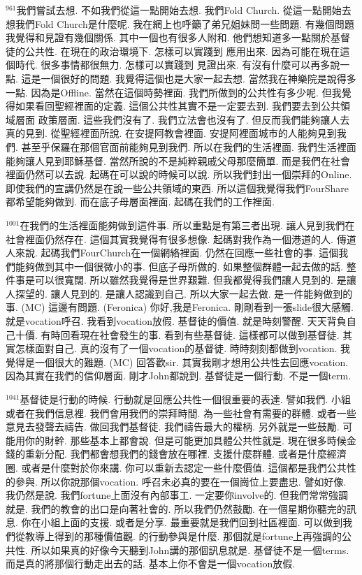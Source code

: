 \documentclass{book}
\begin{document}
$^{961}$我們嘗試去想.
不如我們從這一點開始去想.
我們Fold Church.
從這一點開始去想我們Fold Church是什麼呢.
我在網上也呼籲了弟兄姐妹問一些問題.
有幾個問題我覺得和見證有幾個關係.
其中一個也有很多人附和.
他們想知道多一點關於基督徒的公共性.
在現在的政治環境下.
怎樣可以實踐到 應用出來.
因為可能在現在這個時代.
很多事情都很無力.
怎樣可以實踐到 見證出來.
有沒有什麼可以再多說一點.
這是一個很好的問題.
我覺得這個也是大家一起去想.
當然我在神樂院是說得多一點.
因為是Offline.
當然在這個時勢裡面.
我們所做到的公共性有多少呢.
但我覺得如果看回聖經裡面的定義.
這個公共性其實不是一定要去到.
我們要去到公共領域層面 政策層面.
這些我們沒有了.
我們立法會也沒有了.
但反而我們能夠讓人去真的見到.
從聖經裡面所說.
在安提阿教會裡面.
安提阿裡面城市的人能夠見到我們.
甚至乎保羅在那個官面前能夠見到我們.
所以在我們的生活裡面.
我們生活裡面能夠讓人見到耶穌基督.
當然所說的不是純粹親戚父母那麼簡單.
而是我們在社會裡面仍然可以去說.
起碼在可以說的時候可以說.
所以我們封出一個崇拜的Online.
即使我們的宣講仍然是在說一些公共領域的東西.
所以這個我覺得我們FourShare都希望能夠做到.
而在底子母層面裡面.
起碼在我們的工作裡面.

$^{1001}$在我們的生活裡面能夠做到這件事.
所以重點是有第三者出現.
讓人見到我們在社會裡面仍然存在.
這個其實我覺得有很多想像.
起碼對我作為一個港道的人.
傳道人來說.
起碼我們FourChurch在一個網絡裡面.
仍然在回應一些社會的事.
這個我們能夠做到其中一個很微小的事.
但底子母所做的.
如果整個群體一起去做的話.
整件事是可以很寬闊.
所以雖然我覺得是世界艱難.
但我都覺得我們讓人見到的.
是讓人探望的.
讓人見到的.
是讓人認識到自己.
所以大家一起去做.
是一件能夠做到的事.
(MC) 這邊有問題.
(Feronica) 你好,我是Feronica.
剛剛看到一張slide很大感觸.
就是vocation呼召.
我看到vocation放假.
基督徒的價值.
就是時刻警醒.
天天背負自己十價.
有時回看現在社會發生的事.
看到有些基督徒.
這樣都可以做到基督徒.
其實怎樣面對自己.
真的沒有了一個vocation的基督徒.
時時刻刻都做到vocation.
我覺得是一個很大的難題.
(MC) 回答歡sir.
其實我剛才想用公共性去回應vocation.
因為其實在我們的信仰層面.
剛才John都說到.
基督徒是一個行動.
不是一個term.

$^{1041}$基督徒是行動的時候.
行動就是回應公共性一個很重要的表達.
譬如我們.
小組或者在我們信息裡.
我們會用我們的崇拜時間.
為一些社會有需要的群體.
或者一些意見去發聲去禱告.
做回我們基督徒.
我們禱告最大的權柄.
另外就是一些鼓勵.
可能用你的財幹.
那些基本上都會說.
但是可能更加具體公共性就是.
現在很多時候金錢的重新分配.
我們都會想我們的錢會放在哪裡.
支援什麼群體.
或者是什麼經濟圈.
或者是什麼對於你來講.
你可以重新去認定一些什麼價值.
這個都是我們公共性的參與.
所以你說那個vocation.
呼召未必真的要在一個崗位上要盡忠.
譬如好像.
我仍然是說.
我們fortune上面沒有內部事工.
一定要你involve的.
但我們常常強調就是.
我們的教會的出口是向著社會的.
所以我們仍然鼓勵.
在一個星期你聽完的訊息.
你在小組上面的支援.
或者是分享.
最重要就是我們回到社區裡面.
可以做到我們從教導上得到的那種價值觀.
的行動參與是什麼.
那個就是fortune上再強調的公共性.
所以如果真的好像今天聽到John講的那個訊息就是.
基督徒不是一個terms.
而是真的將那個行動走出去的話.
基本上你不會是一個vocation放假.
\end{document}
